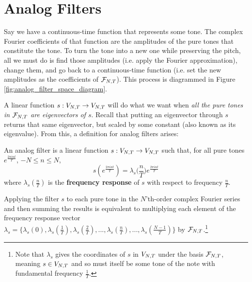 
\section{Analog Filters}

\par \indentt Say we have a continuous-time function that represents some tone. The complex Fourier coefficients of that function are the amplitudes of the pure tones that constitute the tone. To turn the tone into a new one while preserving the pitch, all we must do is find those amplitudes (i.e. apply the Fourier approximation), change them, and go back to a continuous-time function (i.e. set the new amplitudes as the coefficients of $\mathcal{F}_{N,T}$). This process is diagrammed in Figure \ref{fig:analog_filter_space_diagram}.

\par \bigskip A linear function $s: V_{N,T} \rightarrow V_{N,T}$ will do what we want when \textit{all the pure tones in $\mathcal{F}_{N,T}$ are eigenvectors of $s$}. Recall that putting an eigenvector through $s$ returns that same eigenvector, but scaled by some constant (also known as its eigenvalue). From this, a definition for analog filters arises:

\begin{definition}
    An analog filter is a linear function $s: V_{N,T} \rightarrow V_{N,T}$ such that, for all pure tones $e^{\frac{2\pi int}{T}}$, $-N\le n\le N$, $$s(e^{\frac{2\pi int}{T}})=\lambda_s\bigg(\frac{n}{T}\bigg)e^{\frac{2\pi int}{T}}$$
    where $\lambda_s(\frac{n}{T})$ is the \textbf{frequency response} of $s$ with respect to frequency $\frac{n}{T}$.\cite{Ryan}
    \label{defn:analog_filter}
\end{definition}

Applying the filter $s$ to each pure tone in the $N$'th-order complex Fourier series and then summing the results is equivalent to multiplying each element of the frequency response vector $\lambda_s = \{\lambda_s(0),\lambda_s(\frac{1}{T}),\lambda_s(\frac{2}{T}),...,\lambda_s(\frac{n}{T}),...,\lambda_s(\frac{N-1}{T})\}$ by $\mathcal{F}_{N,T}$.\footnote{Note that $\lambda_s$ gives the coordinates of $s$ in $V_{N,T}$ under the basis $\mathcal{F}_{N,T}$, meaning $s\in V_{N,T}$ and so must itself be some tone of the note with fundamental frequency $\frac{1}{T}$.}

